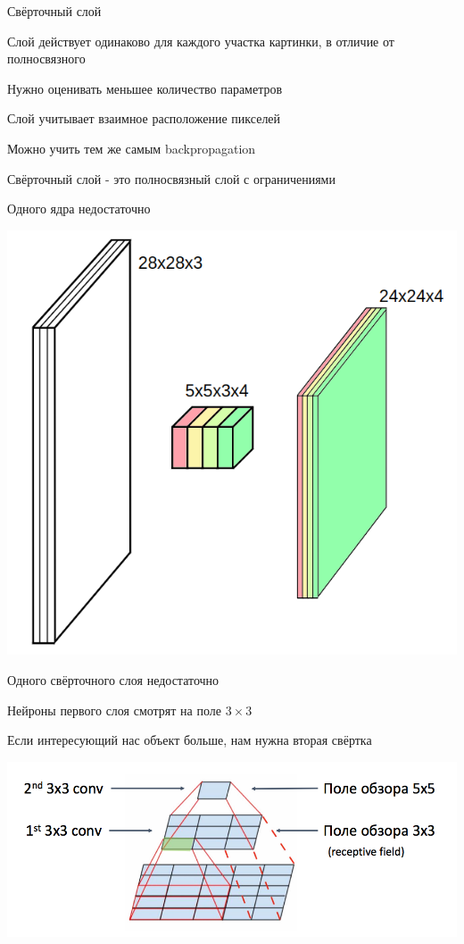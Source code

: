 \documentclass[notes,12pt, aspectratio=169]{beamer}
\newenvironment{wideitemize}{\itemize\addtolength{\itemsep}{10pt}}{\enditemize}
\begin{document}
\begin{frame}{Свёрточный слой}
\begin{wideitemize}
	\item  Слой действует одинаково для каждого участка картинки, в отличие от полносвязного 
	\item  Нужно оценивать меньшее количество параметров
	\item  Слой учитывает взаимное расположение пикселей
	\item  Можно учить тем же самым backpropagation 
	\item  Свёрточный слой -  это полносвязный слой с ограничениями
\end{wideitemize}
\end{frame}


\begin{frame}{Одного ядра недостаточно}
\begin{center}
	\includegraphics[width=.5\linewidth]{convolution3.png}
\end{center}
\end{frame}


\begin{frame}{Одного свёрточного слоя недостаточно}
\begin{wideitemize}
	\item  Нейроны первого слоя смотрят на поле $3 \times 3$ 
	\item  Если интересующий нас объект больше, нам нужна вторая свёртка 
\end{wideitemize}

\begin{center}
	\includegraphics[width=.8\linewidth]{rec_field.png}
\end{center}
\end{frame}
\end{document}
